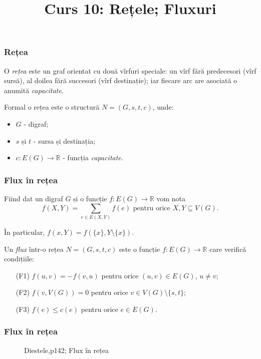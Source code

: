 \title{Curs 10: Rețele; Fluxuri}



\maketitle

\begin{frame}
  \frametitle{Rețea}

O \emph{rețea} este un graf orientat cu două vîrfuri speciale: un vîrf fără predecesori (vîrf sursă), al doilea fără succesori (vîrf destinație); iar fiecare arc are asociată o anumită \emph{capacitate}.

Formal o rețea este o structură $N=(G,s,t,c)$, unde:
\begin{itemize}
  \item $G$ - digraf;
  \item $s$ și $t$ - sursa și destinația;
  \item $c:E(G)\to\mathbb{R}$ - funcția \emph{capacitate}.
\end{itemize}

\end{frame}

\begin{frame}
  \frametitle{Flux în rețea}

Fiind dat un digraf $G$ și o funcție $f:E(G)\to\mathbb{R}$ vom nota
\[
  f(X,Y)=\sum_{e\in E(X,Y)} f(e) \text{ pentru orice } X,Y\subseteq V(G).
\]

În particular, $f(x,Y) = f(\{x\},Y\setminus \{x\})$.

Un \emph{flux} într-o rețea $N=(G,s,t,c)$ este o funcție $f:E(G)\to\mathbb{R}$ care verifică condițiile:
\begin{enumerate}
  \item[(F1)] $f(u,v)=-f(v,u)$ pentru orice $(u,v)\in E(G)$, $u\neq v$;
  \item[(F2)] $f(v,V(G))=0$ pentru orice $v\in V(G)\setminus\{s,t\}$;
  \item[(F3)] $f(e)\leq c(e)$ pentru orice $e\in E(G)$.
\end{enumerate}

\end{frame}

\begin{frame}
  \frametitle{Flux în rețea}

\begin{figure}
\centering%
\caption{Diestele,p142; Flux în rețea}
\end{figure}

\end{frame}


